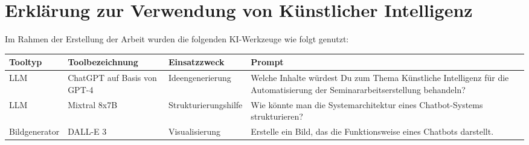 
\section*{Erklärung zur Verwendung von Künstlicher Intelligenz}

\thispagestyle{empty}
\bigskip
Im Rahmen der Erstellung der Arbeit wurden die folgenden KI-Werkzeuge wie folgt genutzt:


\begin{table}[ht]
  \centering
  {\small 
    \emergencystretch=100mm
    \begin{tabular}{p{3cm}p{3cm}p{3cm}p{5cm}}
      \hline
      Tooltyp & Toolbezeichnung & Einsatzzweck & Prompt \\
      \hline
      LLM &
      ChatGPT auf Basis von GPT-4 &
      Ideengenerierung &
      Welche Inhalte würdest Du zum Thema Künstliche Intelligenz für die Automatisierung der Seminararbeitserstellung behandeln? \\ 
      \hline
      LLM &
      Mixtral 8x7B &
      Strukturierungshilfe &
      Wie könnte man die Systemarchitektur eines Chatbot-Systems strukturieren? \\ 
      \hline
      Bildgenerator &
      DALL-E 3&
      Visualisierung &
      Erstelle ein Bild, das die Funktionsweise eines Chatbots darstellt. \\
      \hline
    \end{tabular}
  }
\end{table}

